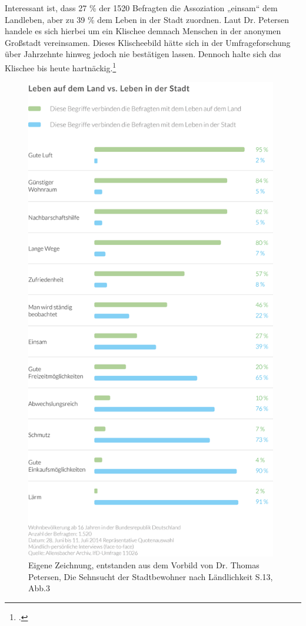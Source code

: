 \documentclass{scrartcl}
\begin{document}
Interessant ist, dass 27 \% der 1520 Befragten die Assoziation „einsam“ dem Landleben, aber zu 39 \% dem Leben in der Stadt zuordnen. Laut Dr. Petersen handele es sich hierbei um ein Klischee demnach Menschen in der anonymen Großstadt vereinsamen. Dieses Klischeebild hätte sich in der Umfrageforschung über Jahrzehnte hinweg jedoch nie bestätigen lassen. Dennoch halte sich das Klischee bis heute hartnäckig.\footcite[Vgl.][S. 7ff]{Dr.ThomasPetersen2014DieLandlichkeit}

\begin{figure}[htbp]
\centering
\includegraphics[width=11cm]{image_folder/SchaubildStadtVsLand_Umfrage.png}
\caption{Eigene Zeichnung, entstanden aus dem Vorbild von Dr. Thomas Petersen, Die Sehnsucht der Stadtbewohner nach Ländlichkeit S.13, Abb.3}
\label{fig:SchaubildStadtVsLandUmfrage}
\end{figure}
\end{document}

